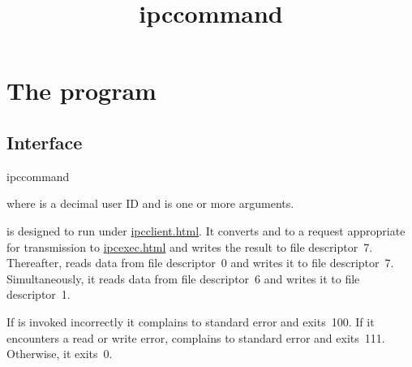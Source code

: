 \documentclass{book}
\title{ipccommand}
\begin{document}
\section{The  program}

\subsection{Interface}
\begin{code}%
  ipccommand  
\end{code}
where  is a decimal user ID and  is one or more arguments.

 is designed to run under
\href{\cmd{ipcclient}}{ipcclient.html}.  It converts  and 
to a request appropriate for transmission to \href{\cmd{ipcexec}}{ipcexec.html}
and writes the result to file descriptor~7.  Thereafter,  reads
data from file descriptor~0 and writes it to file descriptor~7.  Simultaneously,
it reads data from file descriptor~6 and writes it to file descriptor~1.

If  is invoked incorrectly it complains to standard error and
exits~100.  If it encounters a read or write error,  complains
to standard error and exits~111.  Otherwise, it exits~0.
\end{document}
